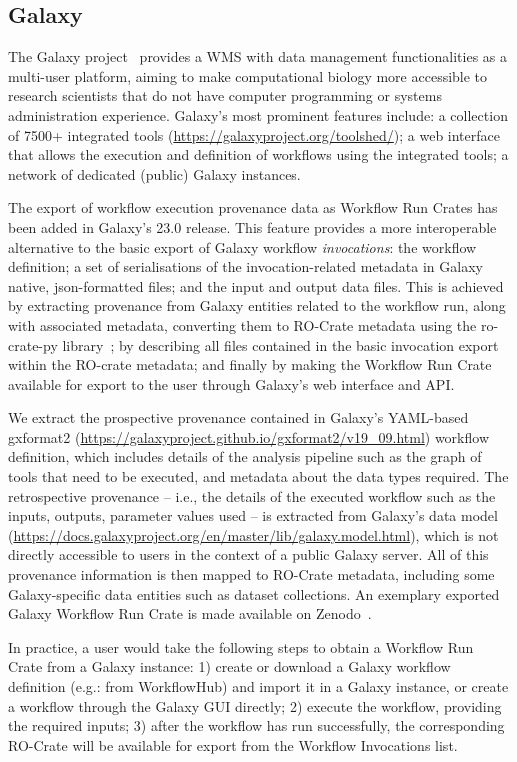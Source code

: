 \documentclass[10pt,letterpaper]{article}
\begin{document}
\subsection{Galaxy}\label{galaxy}

The Galaxy project~\cite{Jalili 2020} provides a WMS with data management functionalities as a multi-user platform, aiming to make computational biology more accessible to research scientists that do not have computer programming or systems administration experience.
Galaxy's most prominent features include: a collection of 7500+ integrated tools (\url{https://galaxyproject.org/toolshed/});
a web interface that allows the execution and definition of workflows using the integrated tools; a network of dedicated (public) Galaxy instances.

The export of workflow execution provenance data as Workflow Run Crates has been added in Galaxy's 23.0 release.
This feature provides a more interoperable alternative to the basic export of Galaxy workflow
\emph{invocations}: the workflow definition; a set of serialisations of the invocation-related metadata in Galaxy native, json-formatted files;
and the input and output data files.
This is achieved by extracting provenance from Galaxy entities related to the workflow run, along with associated metadata, converting them to RO-Crate metadata using the ro-crate-py library~\cite{De Geest 2022}; by describing all files contained in the basic invocation export within the RO-crate metadata;
and finally by making the Workflow Run Crate available for export to the user through Galaxy's web interface and API.

We extract the prospective provenance contained in Galaxy's YAML-based gxformat2
(\url{https://galaxyproject.github.io/gxformat2/v19_09.html}) workflow definition, which includes details of the analysis pipeline such as the graph of tools that need to be executed, and metadata about the data types required.
The retrospective provenance -- i.e., the details of the executed workflow such as the inputs, outputs, parameter values used -- is extracted from Galaxy's data model (\url{https://docs.galaxyproject.org/en/master/lib/galaxy.model.html}), which is not directly accessible to users in the context of a public Galaxy server.
All of this provenance information is then mapped to RO-Crate metadata, including some Galaxy-specific data entities such as dataset collections.
An exemplary exported Galaxy Workflow Run Crate is made available on Zenodo~\cite{De Geest 2023}.

In practice, a user would take the following steps to obtain a Workflow Run Crate from a Galaxy instance: 1) create or download a Galaxy workflow definition (e.g.: from WorkflowHub) and import it in a Galaxy instance, or create a workflow through the Galaxy GUI directly; 2) execute the workflow, providing the required inputs; 3) after the workflow has run successfully, the corresponding RO-Crate will be available for export from the Workflow Invocations list.
\end{document}
